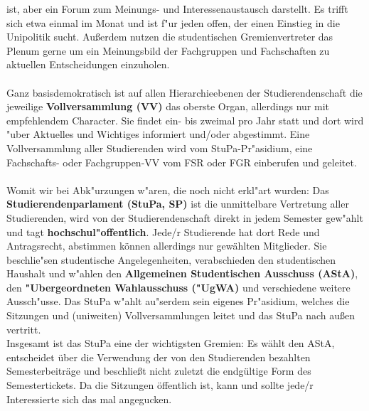 ist, aber ein Forum zum Meinungs- und Interessenaustausch darstellt. Es trifft 
sich etwa einmal im Monat und ist f"ur jeden offen, der einen Einstieg in die 
Unipolitik sucht. Außerdem nutzen die studentischen Gremienvertreter das Plenum gerne 
um ein Meinungsbild der Fachgruppen und Fachschaften zu aktuellen Entscheidungen einzuholen.
\\
\\
Ganz basisdemokratisch ist auf allen Hierarchie\-ebenen der Studierendenschaft
die jeweilige \textbf{Vollversammlung (VV)} das oberste Organ, allerdings nur
mit empfehlendem Character. Sie findet ein- bis zweimal pro Jahr statt und
dort wird "uber Aktuelles und Wichtiges informiert und/oder abgestimmt. Eine
Vollversammlung aller Studierenden wird vom StuPa-Pr"asidium, eine 
Fachschafts- oder Fachgruppen-VV vom FSR oder FGR einberufen und geleitet.
\\
\\
Womit wir bei Abk"urzungen w"aren, die noch nicht erkl"art wurden: Das \textbf{Studierendenparlament (StuPa, SP)} ist die 
unmittelbare Vertretung aller Studierenden, wird von der Studierendenschaft 
direkt in jedem Semester gew"ahlt und tagt \textbf{hochschul"offentlich}.
Jede/r Studierende hat dort Rede und Antragsrecht, abstimmen können allerdings nur 
gewählten Mitglieder. Sie beschlie"sen studentische Angelegenheiten, verabschieden den studentischen 
Haushalt und w"ahlen den \textbf{Allgemeinen Studentischen Ausschuss (AStA)},
den \textbf{"Ubergeordneten Wahlausschuss ("UgWA)}
und verschiedene weitere Aussch"usse. Das StuPa w"ahlt au"serdem sein eigenes
Pr"asidium, welches die Sitzungen und (uniweiten) Vollversammlungen leitet und
das StuPa nach außen  vertritt.  \\
Insgesamt ist das StuPa eine der wichtigsten Gremien: Es wählt den AStA, entscheidet über die Verwendung der von den Studierenden bezahlten Semesterbeiträge 
und beschließt nicht zuletzt die endgültige Form des Semestertickets. 
Da die Sitzungen öffentlich ist, kann und sollte jede/r Interessierte sich das mal angegucken.
\\\\

